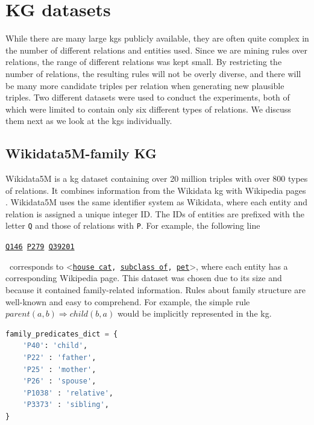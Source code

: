 \section{KG datasets}
While there are many large \glspl{kg} publicly available, they are often quite complex in the number of different relations and entities used. Since we are mining rules over relations, the range of different relations was kept small. By restricting the number of relations, the resulting rules will not be overly diverse, and there will be many more candidate triples per relation when generating new plausible triples. Two different datasets were used to conduct the experiments, both of which were limited to contain only six different types of relations. We discuss them next as we look at the \glspl{kg} individually.


\subsection{Wikidata5M-family KG}
Wikidata5M is a \gls{kg} dataset containing over 20 million triples with over 800 types of relations. It combines information from the Wikidata \gls{kg} with Wikipedia pages \cite{wang2019kepler}. Wikidata5M uses the same identifier system as Wikidata, where each entity and relation is assigned a unique integer ID. The IDs of entities are prefixed with the letter \texttt{Q} and those of relations with \texttt{P}. For example, the following line \\
\centerline{\texttt{\href{https://www.wikidata.org/wiki/Q146}{Q146} \quad \href{https://www.wikidata.org/wiki/Property:P279}{P279} \quad  \href{https://www.wikidata.org/wiki/Q39201}{Q39201}}} \
corresponds to \textless\texttt{\href{https://www.wikidata.org/wiki/Q146}{house cat}, \href{https://www.wikidata.org/wiki/Property:P279}{subclass of}, \href{https://www.wikidata.org/wiki/Q39201}{pet}}\textgreater, where each entity has a corresponding Wikipedia page.
This dataset was chosen due to its size and because it contained family-related information. Rules about family structure are well-known and easy to comprehend. For example, the simple rule $parent(a, b) \Rightarrow  child(b, a)$ would be implicitly represented in the \gls{kg}.
\begin{lstlisting}[float, language=Python, caption={Python dictionary converting family predicate IDs to their names.},captionpos=t, label={family_predicated_dict}]
family_predicates_dict = {
    'P40': 'child', 
    'P22' : 'father', 
    'P25' : 'mother',
    'P26' : 'spouse', 
    'P1038' : 'relative', 
    'P3373' : 'sibling', 
}
\end{lstlisting}

